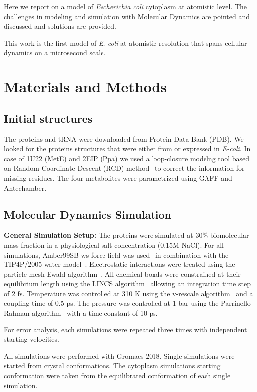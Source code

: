\documentclass[journal=jacsat,manuscript=article]{achemso}
\begin{document}
Here we report on a model of {\em Escherichia coli} cytoplasm at atomistic level. The challenges in modeling and simulation with Molecular Dynamics are pointed and discussed and solutions are provided. 

This work is the first model of {\em E. coli} at atomistic resolution that spans cellular dynamics on a microsecond scale.




\section*{Materials and Methods}


\subsection*{Initial structures}
The proteins and tRNA were downloaded from Protein Data Bank (PDB). We looked for the proteins structures that were either from or expressed in {\em E-coli}. In case of 1U22 (MetE) and 2EIP (Ppa) we used a loop-closure modelng tool based on Random Coordinate Descent (RCD) method~\cite{Chys2013} to correct the information for missing residues. The four metabolites were parametrized using GAFF and Antechamber. 

\subsection*{Molecular Dynamics Simulation}

 
{\bf General Simulation Setup: }The proteins were simulated at 30\% biomolecular mass fraction in  a physiological salt concentration (0.15M NaCl). For all simulations, Amber99SB-ws force field was used~\cite{Best2014a} in combination with the TIP4P/2005 water model~\cite{Abascal2005b}. Electrostatic interactions were treated using the particle mesh Ewald algorithm~\cite{Essmann1995a}. All chemical bonds were constrained at their equilibrium length using the LINCS algorithm~\cite{Hess2008b} allowing an integration time step of 2 fs. Temperature was controlled at 310 K using the v-rescale algorithm~\cite{Bussi2007a} and a coupling time of 0.5 ps. The pressure was controlled at 1 bar using the Parrinello-Rahman algorithm~\cite{Parrinello1981a} with a time constant of 10 ps.  


For error analysis, each simulations were repeated three times with independent starting velocities.

All simulations were performed with Gromacs 2018. Single simulations were started from crystal conformations. The cytoplasm simulations starting conformation were taken from the equilibrated conformation of each single simulation.
\end{document}
